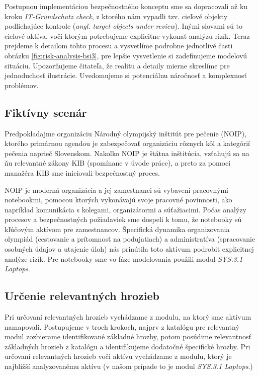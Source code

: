 Postupnou implementáciou bezpečnostného konceptu sme sa dopracovali až ku kroku \emph{IT-Grundschutz check}, z ktorého nám vypadli tzv. cieľové objekty
podliehajúce kontrole (\emph{angl. target objects under review}). Inými slovami sú to cieľové aktíva, voči ktorým potrebujeme explicitne vykonať
analýzu rizík. Teraz prejdeme k detailom tohto procesu a vysvetlíme podrobne jednotlivé časti obrázku \ref{fig:risk-analysis-bsi3}, pre lepšie vysvetlenie 
si zadefinujeme modelovú situáciu. Upozorňujeme čitateľa, že realitu a detaily mierne skreslíme pre jednoduchosť ilustrácie. Uvedomujeme si potenciálnu
náročnosť a komplexnosť problémov.

\subsection*{Fiktívny scenár}

Predpokladajme organizáciu Národný olympijský inštitút pre pečenie (NOIP), ktorého primárnou agendou je zabezpečovať organizáciu rôznych kôl a kategórií
pečenia naprieč Slovenskom. Nakoľko NOIP je štátna inštitúcia, vzťahujú sa na ňu relevantné zákony KIB (spomínane v úvode práce), a preto za pomoci 
manažéra KIB sme iniciovali bezpečnostný proces.

NOIP je moderná organizácia a jej zamestnanci sú vybavení pracovnými notebookmi, pomocou ktorých vykonávajú svoje pracovné povinnosti, ako napríklad
komunikácia s kolegami, organizátormi a súťažiacimi. Počas analýzy procesov a bezpečnostných požiadaviek sme dospeli k tomu, že notebooky sú kľúčovým
aktívom pre zamestnancov. Špecifická dynamika organizovania olympiád (cestovanie a prítomnosť na podujatiach) a administratíva (spracovanie osobných
údajov a utajenie úloh) nás prinútila toto aktívum podrobiť explicitnej analýze rizík. Pre notebooky sme vo fáze modelovania použili modul \cite{GSK}
\emph{SYS.3.1 Laptops}.

\subsection{Určenie relevantných hrozieb}
Pri určovaní relevantných hrozieb vychádzame z modulu, na ktorý sme aktívum namapovali. Postupujeme v troch krokoch, najprv z katalógu \cite{GSK}
pre relevantný modul zozbierame identifikované základné hrozby, potom posúdime relevantnosť základných hrozieb z katalógu a identifikujeme
dodatočné špecifické hrozby. Pri určovaní relevantných hrozieb voči aktívu vychádzame z modulu, ktorý je najbližší analyzovanému aktívu (v našom
prípade to je modul \emph{SYS.3.1 Laptops}.)

